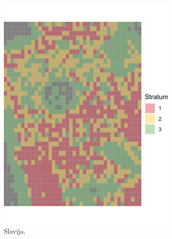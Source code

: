 \documentclass[a4paper,12pt]{article}
\begin{document}
\begin{figure}[H] 
	\centering 
	\includegraphics[width=0.8\textwidth]{../grid_output/strata_viz/slavija-centar_strata.png} 
	\caption{Slavija.} 
	\label{fig:slavija} 
\end{figure}
\end{document}
